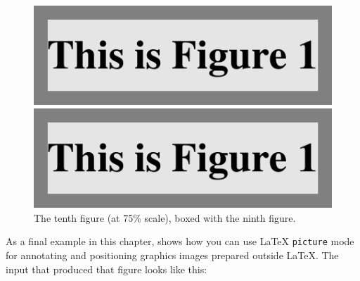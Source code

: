 \begin{figure}[t]
    \centerline{\includegraphics[scale = 0.5]{fig1}}
    \caption[The ninth figure (at 50\% scale)]%
            {The ninth figure (at 50\% scale), boxed with the tenth figure.}
    \vspace{3ex}
    \centerline{\includegraphics[scale = 0.75]{fig1}}
    \caption[The tenth figure (at 75\% scale)]%
            {The tenth figure (at 75\% scale), boxed with the ninth figure.}%
\end{figure}

\blah

\blah

\blah

As a final example in this chapter, 
shows how you can use \LaTeX{} \texttt{picture} mode for
annotating and positioning graphics images prepared outside
\LaTeX{}.  The input that produced that figure looks like
this:

